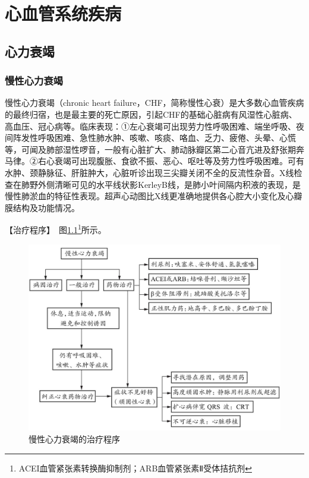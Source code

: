 \chapter{心血管系统疾病}

\section{心力衰竭}

\subsection{慢性心力衰竭}

慢性心力衰竭（chronic heart
failure，CHF，简称慢性心衰）是大多数心血管疾病的最终归宿，也是最主要的死亡原因，引起CHF的基础心脏病有风湿性心脏病、高血压、冠心病等。临床表现：①左心衰竭可出现劳力性呼吸困难、端坐呼吸、夜间阵发性呼吸困难、急性肺水肿、咳嗽、咳痰、咯血、乏力、疲倦、头晕、心慌等，可闻及肺部湿性啰音，一般有心脏扩大、肺动脉瓣区第二心音亢进及舒张期奔马律。②右心衰竭可出现腹胀、食欲不振、恶心、呕吐等及劳力性呼吸困难。可有水肿、颈静脉征、肝脏肿大，心脏听诊出现三尖瓣关闭不全的反流性杂音。X线检查在肺野外侧清晰可见的水平线状影KerleyB线，是肺小叶间隔内积液的表现，是慢性肺淤血的特征性表现。超声心动图比X线更准确地提供各心腔大小变化及心瓣膜结构及功能情况。

【治疗程序】　图\ref{fig2-1-1}\footnote{ACEI血管紧张素转换酶抑制剂；ARB血管紧张素Ⅱ受体拮抗剂}所示。

\begin{figure}[!htbp]
 \centering
 \includegraphics{./images/Image00043.jpg}
 \captionsetup{justification=centering}
 \caption{慢性心力衰竭的治疗程序}
 \label{fig2-1-1}
  \end{figure} 

